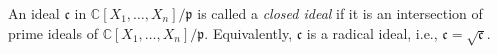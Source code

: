 An ideal $\mathfrak{c}$ in $\mathbb{C}[X_1, \ldots, X_n]/\mathfrak{p}$ is called a \emph{closed ideal} if it is an intersection of prime ideals of $\mathbb{C}[X_1, \ldots, X_n]/\mathfrak{p}$. Equivalently, $\mathfrak{c}$ is a radical ideal, i.e., $\mathfrak{c} = \sqrt{\mathfrak{c}}$.
